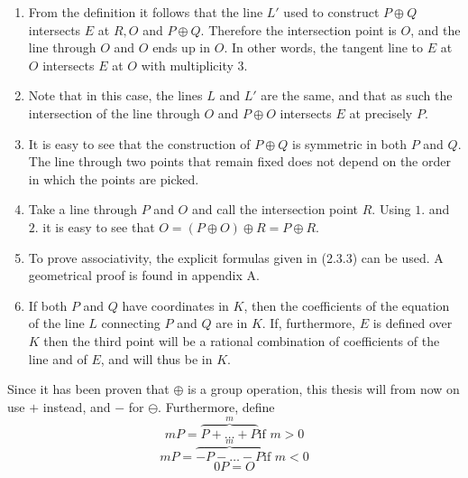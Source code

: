 \begin{prf}
	\text\linebreak
	\begin{enumerate}
		\item From the definition it follows that the line $L'$ used to construct $P\oplus Q$ intersects $E$ at $R,O$ and $P\oplus Q$. Therefore the intersection point is $O$, and the line through $O$ and $O$ ends up in $O$. In other words, the tangent line to $E$ at $O$ intersects $E$ at $O$ with multiplicity 3.
		\item Note that in this case, the lines $L$ and $L'$ are the same, and that as such the intersection of the line through $O$ and $P\oplus O$ intersects $E$ at precisely $P$.
		\item It is easy to see that the construction of $P\oplus Q$ is symmetric in both $P$ and $Q$. The line through two points that remain fixed does not depend on the order in which the points are picked.
		\item Take a line through $P$ and $O$ and call the intersection point $R$. Using $1.$ and $2.$ it is easy to see that $O=(P\oplus O)\oplus R=P\oplus R.$
		\item To prove associativity, the explicit formulas given in (2.3.3) can be used. A geometrical proof is found in appendix A.
		\item If both $P$ and $Q$ have coordinates in $K$, then the coefficients of the equation of the line $L$ connecting $P$ and $Q$ are in $K$. If, furthermore, $E$ is defined over $K$ then the third point will be a rational combination of coefficients of the line and of $E$, and will thus be in $K$.
	\end{enumerate}
\end{prf}
\begin{rem}
	Since it has been proven that $\oplus$ is a group operation, this thesis will from now on use $+$ instead, and $-$ for $\ominus$. Furthermore, define
	\begin{equation*}
	mP=\overbrace{P+\dots+P}^m \text{if } m>0
	\end{equation*}
	\begin{equation*}
	mP=\overbrace{-P-\dots-P}^m \text{if } m<0
	\end{equation*}
	\begin{equation*}
	0P=O
	\end{equation*}
\end{rem}

